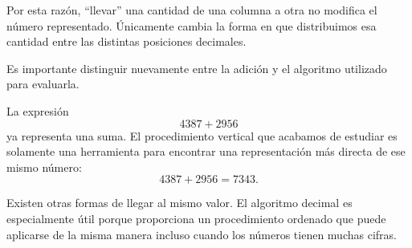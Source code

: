 Por esta razón, ``llevar'' una cantidad de una columna a otra no modifica el número representado. Únicamente cambia la forma en que distribuimos esa cantidad entre las distintas posiciones decimales.

\begin{note}
Es importante distinguir nuevamente entre la adición y el algoritmo utilizado para evaluarla.

La expresión
\[
4387+2956
\]
ya representa una suma. El procedimiento vertical que acabamos de estudiar es solamente una herramienta para encontrar una representación más directa de ese mismo número:
\[
4387+2956=7343.
\]

Existen otras formas de llegar al mismo valor. El algoritmo decimal es especialmente útil porque proporciona un procedimiento ordenado que puede aplicarse de la misma manera incluso cuando los números tienen muchas cifras.
\end{note}
